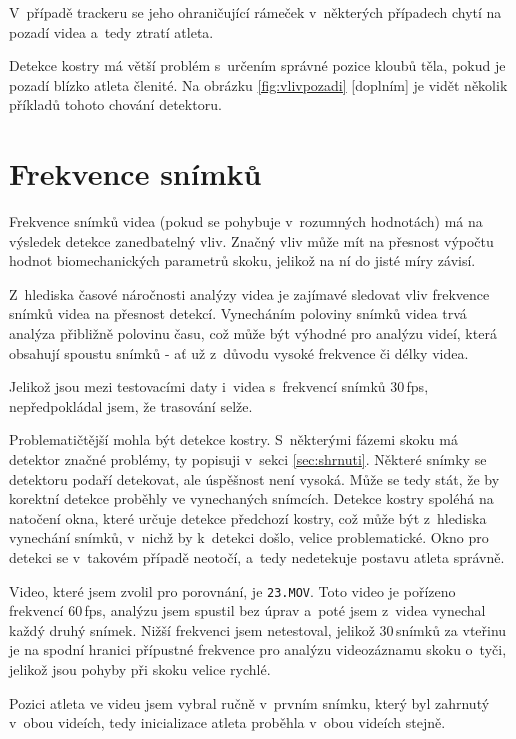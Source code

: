 V~případě trackeru se jeho ohraničující rámeček v~některých případech chytí na pozadí videa a~tedy ztratí atleta.

Detekce kostry má větší problém s~určením správné pozice kloubů těla, pokud je pozadí blízko atleta členité. Na obrázku \ref{fig:vlivpozadi} [doplním] je vidět několik příkladů tohoto chování detektoru.




\section{Frekvence snímků}
\label{sec:frekvence}

Frekvence snímků videa (pokud se pohybuje v~rozumných hodnotách) má na výsledek detekce zanedbatelný vliv. Značný vliv může mít na přesnost výpočtu hodnot biomechanických parametrů skoku, jelikož na ní do jisté míry závisí.

Z~hlediska časové náročnosti analýzy videa je zajímavé sledovat vliv frekvence snímků videa na přesnost detekcí. Vynecháním poloviny snímků videa trvá analýza přibližně polovinu času, což může být výhodné pro analýzu videí, která obsahují spoustu snímků - ať už z~důvodu vysoké frekvence či délky videa.

Jelikož jsou mezi testovacími daty i~videa s~frekvencí snímků $30$\,\rm fps, nepředpokládal jsem, že trasování selže.

Problematičtější mohla být detekce kostry. S~některými fázemi skoku má detektor značné problémy, ty popisuji v~sekci \ref{sec:shrnuti}. Některé snímky se detektoru podaří detekovat, ale úspěšnost není vysoká. Může se tedy stát, že by korektní detekce proběhly ve vynechaných snímcích. Detekce kostry spoléhá na natočení okna, které určuje detekce předchozí kostry, což může být z~hlediska vynechání snímků, v~nichž by k~detekci došlo, velice problematické. Okno pro detekci se v~takovém případě neotočí, a~tedy nedetekuje postavu atleta správně.

Video, které jsem zvolil pro porovnání, je \texttt{23.MOV}. Toto video je pořízeno frekvencí $60$\,\rm fps, analýzu jsem spustil bez úprav a~poté jsem z~videa vynechal každý druhý snímek. Nižší frekvenci jsem netestoval, jelikož $30$\,\rm snímků za vteřinu je na spodní hranici přípustné frekvence pro analýzu videozáznamu skoku o~tyči, jelikož jsou pohyby při skoku velice rychlé.

Pozici atleta ve videu jsem vybral ručně v~prvním snímku, který byl zahrnutý v~obou videích, tedy inicializace atleta proběhla v~obou videích stejně.

